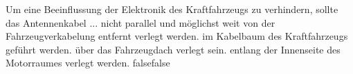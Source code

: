     {Um eine Beeinflussung der Elektronik des Kraftfahrzeugs zu verhindern, sollte das Antennenkabel ...}
    {nicht parallel und möglichst weit von der Fahrzeugverkabelung entfernt verlegt werden.}
    {im Kabelbaum des Kraftfahrzeugs geführt werden.}
    {über das Fahrzeugdach verlegt sein.}
    {entlang der Innenseite des Motorraumes verlegt werden.}
    {false}{false}